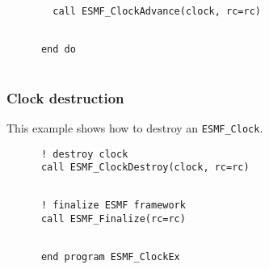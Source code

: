 
 \begin{verbatim}
        call ESMF_ClockAdvance(clock, rc=rc)
 
\end{verbatim}
 

 \begin{verbatim}
      end do
 
\end{verbatim}
 

  \subsubsection{Clock destruction}
 
   This example shows how to destroy an {\tt ESMF\_Clock}. 

 \begin{verbatim}
      ! destroy clock
      call ESMF_ClockDestroy(clock, rc=rc)
 
\end{verbatim}
 

 \begin{verbatim}
      ! finalize ESMF framework
      call ESMF_Finalize(rc=rc)
 
\end{verbatim}
 

 \begin{verbatim}
      end program ESMF_ClockEx
 
\end{verbatim}

\setlength{\parskip}{\oldparskip}
\setlength{\parindent}{\oldparindent}
\setlength{\baselineskip}{\oldbaselineskip}

